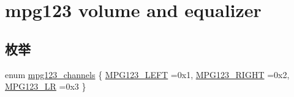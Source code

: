 \hypertarget{group__mpg123__voleq}{}\section{mpg123 volume and equalizer}
\label{group__mpg123__voleq}
\subsection*{枚举}
\begin{DoxyCompactItemize}
\item 
enum \hyperlink{group__mpg123__voleq_gaf6ae0d8c593d295c36e7d20e9f892840}{mpg123\+\_\+channels} \{ \hyperlink{group__mpg123__voleq_ggaf6ae0d8c593d295c36e7d20e9f892840a0442a02c69eba4474b27d271da00478a}{M\+P\+G123\+\_\+\+L\+E\+FT} =0x1, 
\hyperlink{group__mpg123__voleq_ggaf6ae0d8c593d295c36e7d20e9f892840a15ced0bea77e48f6e23d15410058d543}{M\+P\+G123\+\_\+\+R\+I\+G\+HT} =0x2, 
\hyperlink{group__mpg123__voleq_ggaf6ae0d8c593d295c36e7d20e9f892840ab3dd5fa5351f27c4678e30013fceee2b}{M\+P\+G123\+\_\+\+LR} =0x3
 \}
\end{DoxyCompactItemize}
